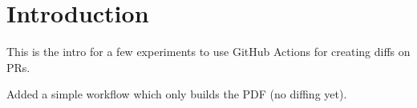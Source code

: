 \documentclass{article}
\begin{document}
\section{Introduction}
\label{sec:introduction}
This is the intro for a few experiments to use GitHub Actions for creating diffs on PRs.

Added a simple workflow which only builds the PDF (no diffing yet).
\end{document}
